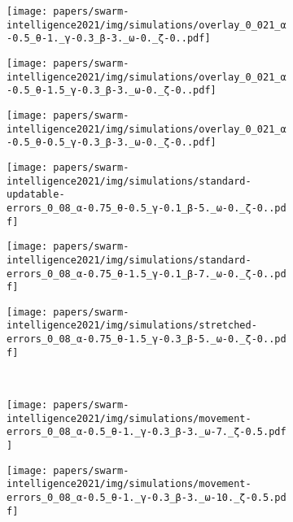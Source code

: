 \begin{figure}[!ht]
  \begin{subfigure}[b]{0.32\textwidth}
    \centering
    \texttt{[image: papers/swarm-intelligence2021/img/simulations/overlay\_0\_021\_α-0.5\_θ-1.\_γ-0.3\_β-3.\_ω-0.\_ζ-0..pdf]}
  \end{subfigure}
  \hfill
  \begin{subfigure}[b]{0.32\textwidth}
    \centering
    \texttt{[image: papers/swarm-intelligence2021/img/simulations/overlay\_0\_021\_α-0.5\_θ-1.5\_γ-0.3\_β-3.\_ω-0.\_ζ-0..pdf]}
  \end{subfigure}
  \hfill
  \begin{subfigure}[b]{0.32\textwidth}
    \centering
    \texttt{[image: papers/swarm-intelligence2021/img/simulations/overlay\_0\_021\_α-0.5\_θ-0.5\_γ-0.3\_β-3.\_ω-0.\_ζ-0..pdf]}
  \end{subfigure}
  \begin{subfigure}[b]{0.32\textwidth}
    \centering
    \texttt{[image: papers/swarm-intelligence2021/img/simulations/standard-updatable-errors\_0\_08\_α-0.75\_θ-0.5\_γ-0.1\_β-5.\_ω-0.\_ζ-0..pdf]}
  \end{subfigure}
  \hfill
  \begin{subfigure}[b]{0.32\textwidth}
    \centering
    \texttt{[image: papers/swarm-intelligence2021/img/simulations/standard-errors\_0\_08\_α-0.75\_θ-1.5\_γ-0.1\_β-7.\_ω-0.\_ζ-0..pdf]}
  \end{subfigure}
  \hfill
  \begin{subfigure}[b]{0.32\textwidth}
    \centering
    \texttt{[image: papers/swarm-intelligence2021/img/simulations/stretched-errors\_0\_08\_α-0.75\_θ-1.5\_γ-0.3\_β-5.\_ω-0.\_ζ-0..pdf]}
  \end{subfigure}
  \\
  \begin{subfigure}[b]{0.32\textwidth}
    \centering
    \texttt{[image: papers/swarm-intelligence2021/img/simulations/movement-errors\_0\_08\_α-0.5\_θ-1.\_γ-0.3\_β-3.\_ω-7.\_ζ-0.5.pdf]}
  \end{subfigure}
  \hfill
  \begin{subfigure}[b]{0.32\textwidth}
    \centering
    \texttt{[image: papers/swarm-intelligence2021/img/simulations/movement-errors\_0\_08\_α-0.5\_θ-1.\_γ-0.3\_β-3.\_ω-10.\_ζ-0.5.pdf]}
  \end{subfigure}

\end{figure}
